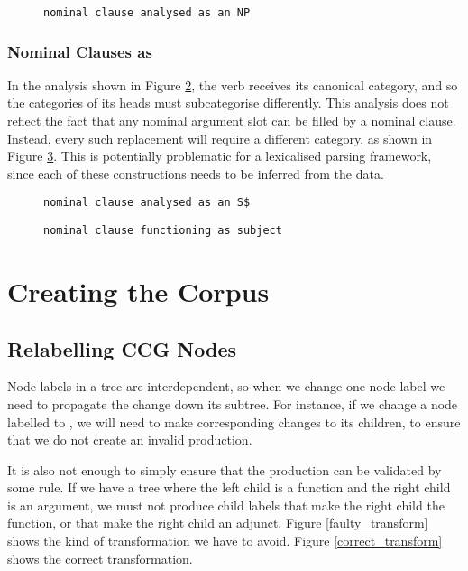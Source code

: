 \begin{figure}
 \begin{verbatim}
nominal clause analysed as an NP
 \end{verbatim}
\label{nom_clause_np}
\end{figure}

\subsubsection{Nominal Clauses as }

In the analysis shown in Figure \ref{nom_clause_S}, the verb receives its canonical category, and so the categories of its heads must subcategorise differently. This analysis does not reflect the fact that any nominal argument slot can be filled by a nominal clause. Instead, every such replacement will require a different category, as shown in Figure \ref{nom_clause_subject}. This is potentially problematic for a lexicalised parsing framework, since each of these constructions needs to be inferred from the data. 

\begin{figure}
 \begin{verbatim}
nominal clause analysed as an S$
 \end{verbatim}
\label{nom_clause_S}
\end{figure}

\begin{figure}
 \begin{verbatim}
nominal clause functioning as subject
 \end{verbatim}
\label{nom_clause_subject}
\end{figure}

\section{Creating the Corpus}

\subsection{Relabelling CCG Nodes}

Node labels in a \ccg tree are interdependent, so when we change one node label we need to propagate the change down its subtree. For instance, if we change a node labelled  to , we will need to make corresponding changes to its children, to ensure that we do not create an invalid production.

It is also not enough to simply ensure that the production can be validated by some \ccg rule. If we have a tree where the left child is a function and the right child is an argument, we must not produce child labels that make the right child the function, or that make the right child an adjunct. Figure \ref{faulty_transform} shows the kind of transformation we have to avoid. Figure \ref{correct_transform} shows the correct transformation.

